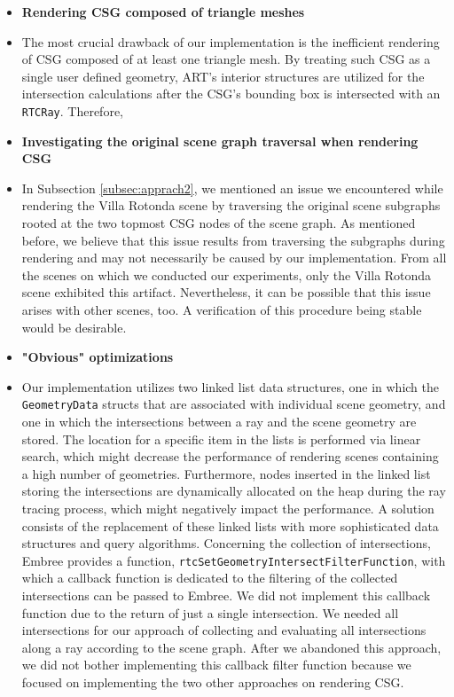 \begin{itemize}
	\setlength\itemsep{0.05em}
	
	\item \textbf{Rendering CSG composed of triangle meshes}
	
	\item[] The most crucial drawback of our implementation is the inefficient rendering of CSG composed of at least one triangle mesh. By treating such CSG as a single user defined geometry, ART's interior structures are utilized for the intersection calculations after the CSG's bounding box is intersected with an \texttt{RTCRay}. Therefore,  
	\\
	
	\item \textbf{Investigating the original scene graph traversal when rendering CSG}
	
	\item[] In Subsection \ref{subsec:apprach2}, we mentioned an issue we encountered while rendering the Villa Rotonda scene by traversing the original scene subgraphs rooted at the two topmost CSG nodes of the scene graph. As mentioned before, we believe that this issue results from traversing the subgraphs during rendering and may not necessarily be caused by our implementation. From all the scenes on which we conducted our experiments, only the Villa Rotonda scene exhibited this artifact. Nevertheless, it can be possible that this issue arises with other scenes, too. A verification of this procedure being stable would be desirable.
	\\
	
	\item \textbf{"Obvious" optimizations}
	
	\item[] Our implementation utilizes two linked list data structures, one in which the \texttt{GeometryData} structs that are associated with individual scene geometry, and one in which the intersections between a ray and the scene geometry are stored. The location for a specific item in the lists is performed via linear search, which might decrease the performance of rendering scenes containing a high number of geometries. Furthermore, nodes inserted in the linked list storing the intersections are dynamically allocated on the heap during the ray tracing process, which might negatively impact the performance. A solution consists of the replacement of these linked lists with more sophisticated data structures and query algorithms. Concerning the collection of intersections, Embree provides a function, \texttt{rtcSetGeometryIntersectFilterFunction}, with which a callback function is dedicated to the filtering of the collected intersections can be passed to Embree. We did not implement this callback function due to the return of just a single intersection. We needed all intersections for our approach of collecting and evaluating all intersections along a ray according to the scene graph. After we abandoned this approach, we did not bother implementing this callback filter function because we focused on implementing the two other approaches on rendering CSG.
	
\end{itemize}


